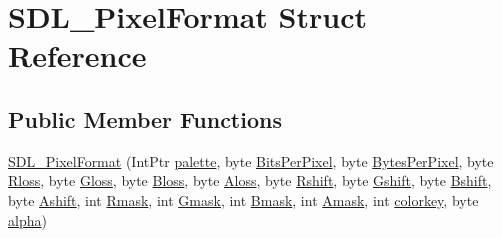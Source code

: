 \hypertarget{struct_s_d_l___pixel_format}{
\section{SDL\_\-PixelFormat Struct Reference}
\label{struct_s_d_l___pixel_format}
}
\subsection*{Public Member Functions}
\begin{DoxyCompactItemize}
\item 
\hyperlink{struct_s_d_l___pixel_format_a88632b1c1d6e3272a6ba65e96daa1539}{SDL\_\-PixelFormat} (IntPtr \hyperlink{struct_s_d_l___pixel_format_a5578b72f8e6c6b8f4feb8e9d67d7af04}{palette}, byte \hyperlink{struct_s_d_l___pixel_format_a28aabdce8eba3259ddea6b43a8703387}{BitsPerPixel}, byte \hyperlink{struct_s_d_l___pixel_format_ad504a9f390e02c8e508419d1a85202f8}{BytesPerPixel}, byte \hyperlink{struct_s_d_l___pixel_format_a1e19f6685404bb72ce971d1f7483c8af}{Rloss}, byte \hyperlink{struct_s_d_l___pixel_format_aa54c85bb3f6868c7c66e7dc58ad6be26}{Gloss}, byte \hyperlink{struct_s_d_l___pixel_format_a8fc149bdf59ec68f4d7c1e11a1bf36d7}{Bloss}, byte \hyperlink{struct_s_d_l___pixel_format_af56c52509223f7ba9a9e3424622f64eb}{Aloss}, byte \hyperlink{struct_s_d_l___pixel_format_a260fab59a09c90b1a4ee2a581a88c1c9}{Rshift}, byte \hyperlink{struct_s_d_l___pixel_format_afa974003c44cf2ce7bd5321cd337508f}{Gshift}, byte \hyperlink{struct_s_d_l___pixel_format_a1997c5cc46cd8e25fc2d231bfc704bed}{Bshift}, byte \hyperlink{struct_s_d_l___pixel_format_a2040187299e831186e04ac50c5dfba33}{Ashift}, int \hyperlink{struct_s_d_l___pixel_format_a10124e3f1900188b3dac9dd618bdefc6}{Rmask}, int \hyperlink{struct_s_d_l___pixel_format_a4a058dff33543ce36cfcf3f2771b40c4}{Gmask}, int \hyperlink{struct_s_d_l___pixel_format_a491f4f2d29b60b352ab7a4ce3b8e14de}{Bmask}, int \hyperlink{struct_s_d_l___pixel_format_a8016d769695a8ce1deee3f44aeb96fa6}{Amask}, int \hyperlink{struct_s_d_l___pixel_format_ab4cf7cddc2293f9b6bb61bb60d06ad5d}{colorkey}, byte \hyperlink{struct_s_d_l___pixel_format_ac0061b3c0c1a204355fb51aba66ff830}{alpha})
\end{DoxyCompactItemize}
